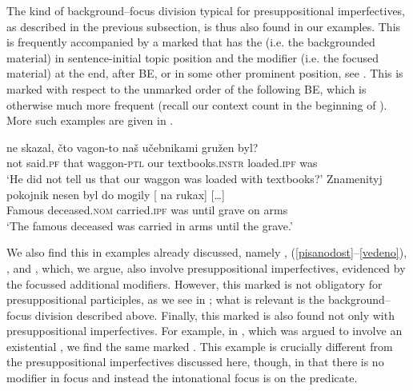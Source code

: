 \documentclass[output=paper,modfonts,newtxmath,hidelinks]{langscibook}
\begin{document}
\noindent The kind of background--focus division typical for presuppositional imperfectives, as described in the previous subsection, is thus also found in our examples. This  is frequently accompanied by a marked  that has the  (i.e. the backgrounded material) in sentence-initial topic position and the modifier (i.e. the focused material) at the end, after BE, or in some other prominent position, see . This  is marked with respect to the unmarked order of the  following BE, which is otherwise much more frequent (recall our context count in the beginning of ). More such examples are given in .

\ea\label{presOF-WO}
\ea\gll	[...] ne skazal, čto vagon-to naš učebnikami gružen byl?\\
	{} not said.\textsc{pf} that waggon-\textsc{ptl} our textbooks.\textsc{instr} loaded.\textsc{ipf} was\\
\glt	`He did not tell us that our waggon was loaded with textbooks?'\label{textbooks}
\ex\gll Znamenityj pokojnik nesen byl do mogily {\hspace{60pt}} [\hspace{-2pt} na rukax] [\dots] \label{nesen} \\
	Famous deceased.\textsc{nom} carried.\textsc{ipf} was until grave {} {} on arms\\
\glt	`The famous deceased was carried in arms until the grave.'
\z\z

\noindent We also find this  in examples already discussed, namely , (\ref{pisanodost}--\ref{vedeno}), , and , which, we argue, also involve presuppositional imperfectives, evidenced by the focussed additional modifiers. However, this marked  is not obligatory for presuppositional  participles, as we see in ; what is relevant is the background--focus division described above. Finally, this marked  is also found not only with presuppositional imperfectives. For example, in , which was argued to involve an existential , we find the same marked . This example is crucially different from the presuppositional imperfectives discussed here, though, in that there is no modifier in focus and instead the intonational focus is on the predicate.
\end{document}
